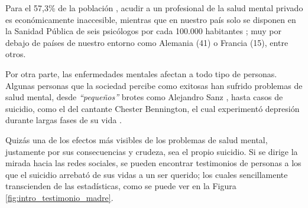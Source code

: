     Para el 57,3\% de la población \cite{confederacion_salud_mental_espana_cuatro_2023}, acudir a un profesional de la salud mental privado es económicamente inaccesible, mientras que en nuestro país solo se disponen en la Sanidad Pública de seis psicólogos por cada 100.000 habitantes \cite{antolin_listas_2023}; muy por debajo de países de nuestro entorno como Alemania (41) o Francia (15), entre otros. 
    
    Por otra parte, las enfermedades mentales afectan a todo tipo de personas. Algunas personas que la sociedad percibe como exitosas han sufrido problemas de salud mental, desde \textit{``pequeños''} brotes como Alejandro Sanz \cite{lopez_chicon_que_2023} \cite{riano_alejandro_2023}, hasta casos de suicidio, como el del cantante Chester Bennington, el cual experimentó depresión durante largas fases de su vida \cite{el_universal_nada_2020} \cite{gambin_historia_2022}.

    Quizás una de los efectos más visibles de los problemas de salud mental, justamente por sus consecuencias y crudeza, sea el propio suicidio. Si se dirige la mirada hacia las redes sociales, se pueden encontrar testimonios de personas a los que el suicidio arrebató de sus vidas a un ser querido; los cuales sencillamente transcienden de las estadísticas, como se puede ver en la Figura \ref{fig:intro_testimonio_madre}.
    
